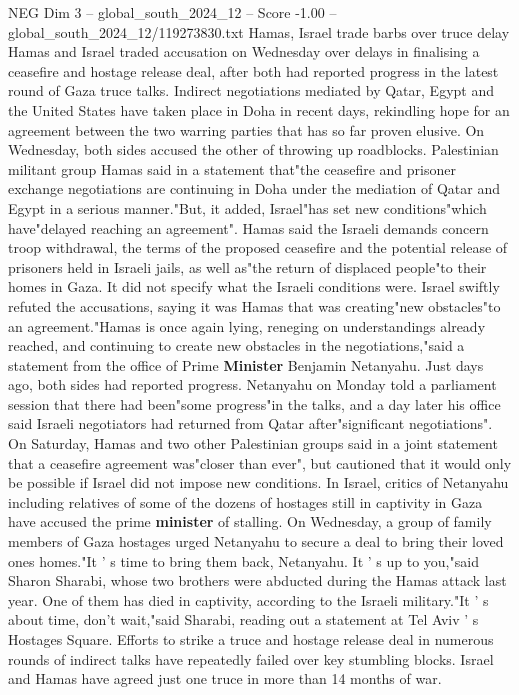 \begin{textsample}{NEG Dim 3 – global\_south\_2024\_12 – Score -1.00 – global\_south\_2024\_12/119273830.txt}  \label{ex:f3_neg_069}
Hamas, Israel trade barbs over truce delay Hamas and Israel traded accusation on Wednesday over delays in finalising a ceasefire and hostage release deal, after both had reported progress in the latest round of Gaza truce talks.
Indirect negotiations mediated by Qatar, Egypt and the United States have taken place in Doha in recent days, rekindling hope for an agreement between the two warring parties that has so far proven elusive.
On Wednesday, both sides accused the other of throwing up roadblocks.
Palestinian militant group Hamas said in a statement that"the ceasefire and prisoner exchange negotiations are continuing in Doha under the mediation of Qatar and Egypt in a serious manner."But, it added, Israel"has set new conditions"which have"delayed reaching an agreement".
Hamas said the Israeli demands concern troop withdrawal, the terms of the proposed ceasefire and the potential release of prisoners held in Israeli jails, as well as"the return of displaced people"to their homes in Gaza.
It did not specify what the Israeli conditions were.
Israel swiftly refuted the accusations, saying it was Hamas that was creating"new obstacles"to an agreement."Hamas is once again lying, reneging on understandings already reached, and continuing to create new obstacles in the negotiations,"said a statement from the office of Prime \textbf{Minister} Benjamin Netanyahu.
Just days ago, both sides had reported progress.
Netanyahu on Monday told a parliament session that there had been"some progress"in the talks, and a day later his office said Israeli negotiators had returned from Qatar after"significant negotiations".
On Saturday, Hamas and two other Palestinian groups said in a joint statement that a ceasefire agreement was"closer than ever", but cautioned that it would only be possible if Israel did not impose new conditions.
In Israel, critics of Netanyahu including relatives of some of the dozens of hostages still in captivity in Gaza have accused the prime \textbf{minister} of stalling.
On Wednesday, a group of family members of Gaza hostages urged Netanyahu to secure a deal to bring their loved ones homes."It ' s time to bring them back, Netanyahu.
It ' s up to you,"said Sharon Sharabi, whose two brothers were abducted during the Hamas attack last year.
One of them has died in captivity, according to the Israeli military."It ' s about time, don't wait,"said Sharabi, reading out a statement at Tel Aviv ' s Hostages Square.
Efforts to strike a truce and hostage release deal in numerous rounds of indirect talks have repeatedly failed over key stumbling blocks.
Israel and Hamas have agreed just one truce in more than 14 months of war.

\end{textsample}
